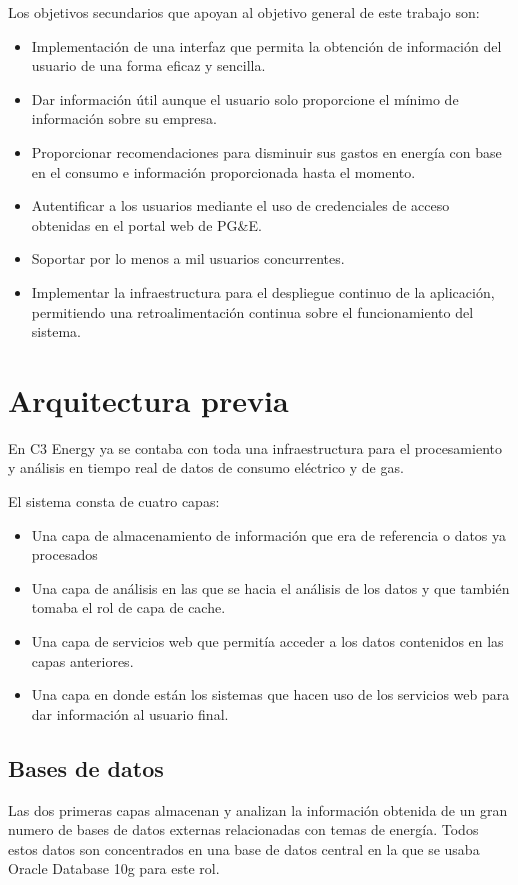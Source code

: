 Los objetivos secundarios que apoyan al objetivo general de este trabajo son:
\begin{itemize}
\item Implementación de una interfaz que permita la obtención
  de información del usuario de una forma eficaz y sencilla.
\item Dar información útil aunque el usuario solo proporcione el
  mínimo de información sobre su empresa.
\item Proporcionar recomendaciones para disminuir sus
  gastos en energía con base en el consumo e información proporcionada
  hasta el momento.
\item Autentificar a los usuarios mediante el uso de credenciales de acceso
  obtenidas en el portal web de PG\&E.
\item Soportar por lo menos a mil usuarios concurrentes.
\item Implementar la infraestructura para el despliegue continuo de la
  aplicación, permitiendo una retroalimentación continua sobre el
  funcionamiento del sistema.
\end{itemize}

\section{Arquitectura previa}
En C3 Energy ya se contaba con toda una infraestructura para el
procesamiento y análisis en tiempo real de datos de consumo eléctrico
y de gas.

El sistema consta de cuatro capas:

\begin{itemize}
\item Una capa de almacenamiento de información que era de referencia
  o datos ya procesados
\item Una capa de análisis en las que se hacia el análisis de los datos
  y que también tomaba el rol de capa de cache.
\item Una capa de servicios web que permitía acceder a los datos contenidos
  en las capas anteriores.
\item Una capa en donde están los sistemas que hacen uso de los
  servicios web para dar información al usuario final.
\end{itemize}

\subsection{Bases de datos}
Las dos primeras capas almacenan y analizan la información obtenida
de un gran numero de bases de datos externas relacionadas con temas
de energía. Todos estos datos son concentrados en una base de datos
central en la que se usaba Oracle Database 10g para este rol.

